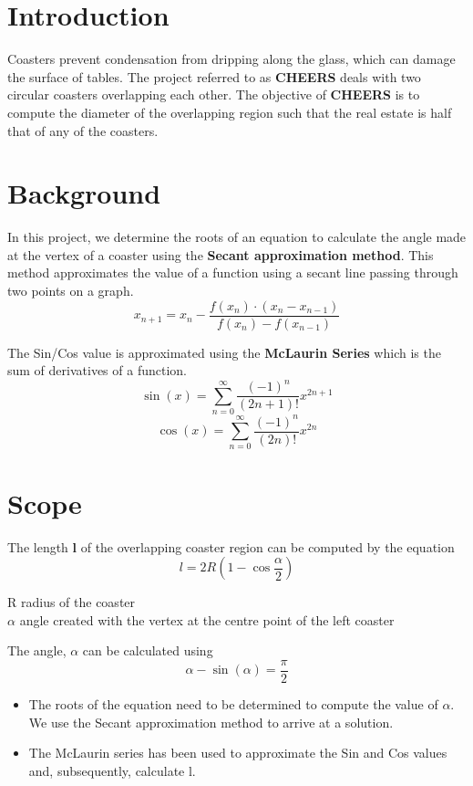 \section{Introduction}
  Coasters prevent condensation from dripping along the glass, which can damage the surface of tables. The project referred to as \textbf {CHEERS} deals with two circular coasters overlapping each other. The objective of \textbf {CHEERS} is to compute the diameter of the overlapping region such that 
  the real estate is half that of any of the coasters.

\section{Background}
  In this project, we determine the roots of an equation to calculate the angle made at the vertex of a coaster using the \textbf{Secant approximation method}. This method approximates the value of a function using a secant line passing through two points on a graph.
  $$ x_{n+1} = x_n - \frac{f(x_n) \cdot (x_n - x_{n-1})}{f(x_n) - f(x_{n-1})} $$

  \vspace*{20pt}
  \noindent The Sin/Cos value is approximated using the \textbf{McLaurin Series} which is the sum of derivatives of a function.
  $$\sin(x) = \sum_{n=0}^{\infty} \frac{(-1)^n}{(2n+1)!}x^{2n+1}$$
  $$\cos(x) = \sum_{n=0}^{\infty} \frac{(-1)^n}{(2n)!}x^{2n}$$ 

\section{Scope}
  The length \textbf{l} of the overlapping coaster region can be computed by the equation
  $$l = 2R\left(1 - \cos\frac{\alpha}{2}\right)$$

  \indent R \textrightarrow \;radius of the coaster \\
  \indent $\alpha$ \textrightarrow \;angle created with the vertex at the centre point of the left coaster

  \vspace{20pt}
  The angle, $\alpha$ can be calculated using
  $$\alpha - \sin(\alpha) = \frac{\pi}{2}$$
  
  \vspace*{20pt}
  
  \begin{itemize}
    \item {The roots of the equation need to be determined to compute the value of $\alpha$. We use the Secant approximation method to arrive at a solution.}
    \item {The McLaurin series has been used to approximate the Sin and Cos values and, subsequently, calculate l.}
  \end{itemize}

